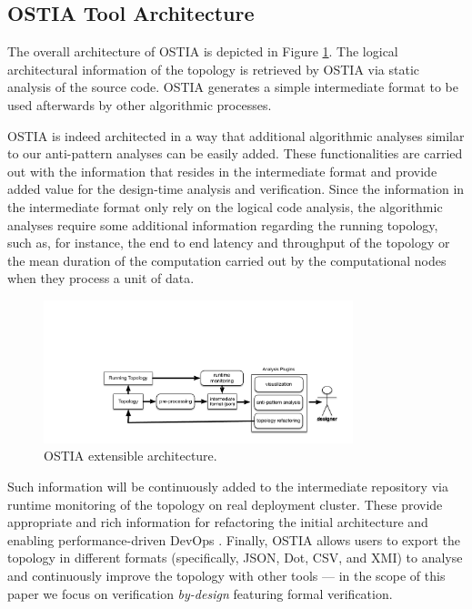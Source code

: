 \subsection{OSTIA Tool Architecture}

The overall architecture of OSTIA is depicted in
Figure \ref{archostia}. The logical architectural information of the
topology is retrieved by OSTIA via static analysis of the source code. OSTIA
generates a simple intermediate format to be used afterwards by other algorithmic
processes.

OSTIA is indeed architected in a way that additional algorithmic analyses similar to our anti-pattern
analyses can be easily added. These functionalities are carried out with the information that resides in the
intermediate format and provide added value for the design-time analysis and verification. Since the information in the intermediate format only rely
on the logical code analysis, the algorithmic analyses require some additional
information regarding the running topology, such as, for instance, the end to end latency and
throughput of the topology or the mean duration of the computation carried out by the computational nodes when they process a unit of data.

\begin{figure}[H]
	\begin{center}
		\includegraphics[width=9cm,draft]{images/fig1}
		\caption{OSTIA extensible architecture.}\label{archostia}
	\end{center}
\end{figure}

Such information will be continuously added to the intermediate repository via
runtime monitoring of the topology on real deployment cluster. These provide
appropriate and rich information for refactoring the initial architecture and
enabling performance-driven DevOps \cite{brunnert2015performance}.
Finally, OSTIA allows users to export the topology in different formats
(specifically, JSON, Dot, CSV, and XMI) to analyse and continuously improve the topology with other tools --- in the scope of this paper we focus on verification \emph{by-design} featuring formal verification.

